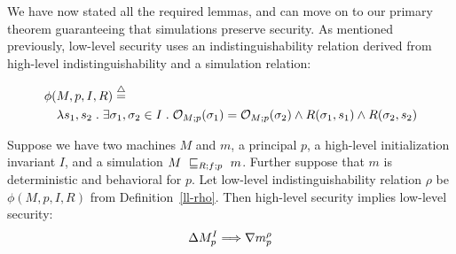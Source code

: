 \vspace{0.5in}
We have now stated all the required lemmas, and can move on
to our primary theorem guaranteeing that simulations preserve
security. As mentioned previously, 
low-level security uses an indistinguishability relation derived
from high-level indistinguishability and a simulation relation:
\begin{definition}
\label{ll-rho}
{\small\begin{align*}
& \phi(M,p,I,R) \isdef \\
& \quad \lambda s_1, s_2 \such 
\exists \sigma_1, \sigma_2 \in I \such 
\observem{M}{p}{\sigma_1} = \observem{M}{p}{\sigma_2} 
\land R(\sigma_1,s_1) \land R(\sigma_2,s_2)
\end{align*}}
\end{definition}

\noindent
\begin{thm}
\label{end-to-end}
Suppose we have two machines $M$ and $m$, a principal $p$, a
high-level initialization invariant $I$, and 
a simulation $\simu{M}{m}{R;f;p}$. Further suppose that
$m$ is deterministic and behavioral for $p$.
Let low-level indistinguishability relation $\rho$ be 
$\phi(M,p,I,R)$ from Definition~\ref{ll-rho}. Then high-level security
implies low-level security:
\[\secure{M}{I}{p} \Longrightarrow \bsecure{m}{\rho}{p}\]
\end{thm}


